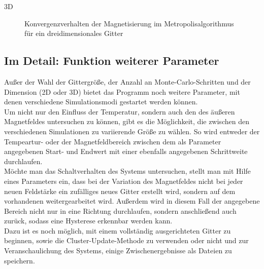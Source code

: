 3D

\begin{figure}[H]
	\centering
	\caption{Konvergenzverhalten der Magnetisierung im Metropolisalgorithmus für ein dreidimensionales Gitter}
	\label{mp3dkonv}
\end{figure}

\subsection{Im Detail: Funktion weiterer Parameter}

Außer der Wahl der Gittergröße, der Anzahl an Monte-Carlo-Schritten und der Dimension (2D oder 3D) bietet das Programm noch weitere Parameter, mit denen verschiedene Simulationsmodi gestartet werden können.\\
Um nicht nur den Einfluss der Temperatur, sondern auch den des äußeren Magnetfeldes untersuchen zu können, gibt es die Möglichkeit, die zwischen den verschiedenen Simulationen zu variierende Größe zu wählen. So wird entweder der Tempeartur- oder der Magnetfeldbereich zwischen dem als Parameter angegebenen Start- und Endwert mit einer ebenfalls angegebenen Schrittweite durchlaufen.\\
Möchte man das Schaltverhalten des Systems untersuchen, stellt man mit Hilfe eines Parameters ein, dass bei der Variation des Magnetfeldes nicht bei jeder neuen Feldstärke ein zufälliges neues Gitter erstellt wird, sondern auf dem vorhandenen weitergearbeitet wird. Außerdem wird in diesem Fall der angegebene Bereich nicht nur in eine Richtung durchlaufen, sondern anschließend auch zurück, sodass eine Hysterese erkennbar werden kann.\\
Dazu ist es noch möglich, mit einem vollständig ausgerichteten Gitter zu beginnen, sowie die Cluster-Update-Methode zu verwenden oder nicht und zur Veranschaulichung des Systems, einige Zwischenergebnisse als Dateien zu speichern.
